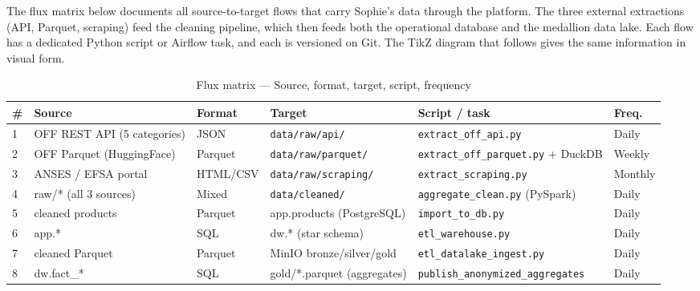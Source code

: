 \documentclass[a4paper,11pt,oneside,openany]{report}
\begin{document}
The flux matrix below documents all source-to-target flows that
carry Sophie's data through the platform. The three external
extractions (API, Parquet, scraping) feed the cleaning pipeline,
which then feeds both the operational database and the medallion
data lake. Each flow has a dedicated Python script or Airflow task,
and each is versioned on Git. The TikZ diagram that follows gives
the same information in visual form.

\begin{table}[H]
\centering
\caption{Flux matrix --- Source, format, target, script, frequency}
\label{tab:flux-matrix}
\begin{tabularx}{\textwidth}{L{0.5cm} L{3.3cm} L{1.6cm} L{3cm} L{3.6cm} L{1.5cm}}
\toprule
\textbf{\#} & \textbf{Source} & \textbf{Format} & \textbf{Target} & \textbf{Script / task} & \textbf{Freq.} \\
 & OFF REST API (5 categories) & JSON & \texttt{data/raw/api/} & \texttt{extract\_off\_api.py} & Daily \\
2 & OFF Parquet (HuggingFace) & Parquet & \texttt{data/raw/parquet/} & \texttt{extract\_off\_parquet.py} + DuckDB & Weekly \\
3 & ANSES / EFSA portal & HTML/CSV & \texttt{data/raw/scraping/} & \texttt{extract\_scraping.py} & Monthly \\
4 & raw/* (all 3 sources) & Mixed & \texttt{data/cleaned/} & \texttt{aggregate\_clean.py} (PySpark) & Daily \\
5 & cleaned products & Parquet & app.products (PostgreSQL) & \texttt{import\_to\_db.py} & Daily \\
6 & app.* & SQL & dw.* (star schema) & \texttt{etl\_warehouse.py} & Daily \\
7 & cleaned Parquet & Parquet & MinIO bronze/silver/gold & \texttt{etl\_datalake\_ingest.py} & Daily \\
8 & dw.fact\_* & SQL & gold/*.parquet (aggregates) & \texttt{publish\_anonymized\_aggregates} & Daily \\
\bottomrule
\end{tabularx}
\end{table}
\end{document}
